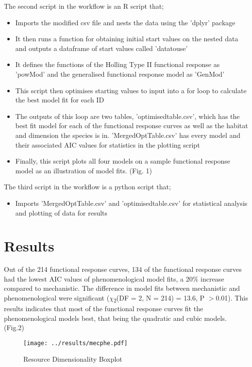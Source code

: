 \documentclass[11pt]{article}
\begin{document}
The second script in the workflow is an R script that;
\begin{itemize}
	\item Imports the modified csv file and nests the data using the 'dplyr' package 
	\item It then runs a function for obtaining initial start values on the nested data and outputs a dataframe of start values called 'datatouse'
	\item It defines the functions of the Holling Type II functional response as 'powMod' and the generalised functional response model as 'GenMod'
	\item This script then optimises starting values to input into a for loop to calculate the best model fit for each ID 
	\item The outputs of this loop are two tables, 'optimisedtable.csv', which has the best fit model for each of the functional response curves as well as the habitat and dimension the species is in. 'MergedOptTable.csv' has every model and their associated AIC values for statistics in the plotting script 
	\item Finally, this script plots all four models on a sample functional response model as an illustration of model fits. (Fig. 1)
\end{itemize}

The third script in the workflow is a python script that;
\begin{itemize}
	\item Imports 'MergedOptTable.csv' and 'optimisedtable.csv' for statistical analysis and plotting of data for results 
\end{itemize}


	\section{Results}
\noindent

Out of the 214 functional response curves, 134 of the functional response curves had the lowest AIC values of phenomenological model fits, a 20\% increase compared to mechanistic. The difference in model fits between mechanistic and phenomenological were significant ($\chi$\textsubscript{2}(DF = 2, N = 214) = 13.6, P $>$0.01).  This results indicates that most of the functional response curves fit the phenomenological models best, that being the quadratic and cubic models. (Fig.2) \newline

\begin{figure}[h!]
	
	\texttt{[image: ../results/mecphe.pdf]}
	\caption{Resource Dimensionality Boxplot}
	\label{Model Type comparison}
	
\end{figure}
\end{document}
